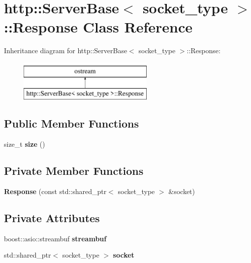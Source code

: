 \hypertarget{classhttp_1_1_server_base_1_1_response}{}\section{http\+:\+:Server\+Base$<$ socket\+\_\+type $>$\+:\+:Response Class Reference}
\label{classhttp_1_1_server_base_1_1_response}
Inheritance diagram for http\+:\+:Server\+Base$<$ socket\+\_\+type $>$\+:\+:Response\+:\begin{figure}[H]
\begin{center}
\leavevmode
\includegraphics[height=2.000000cm]{d8/d5c/classhttp_1_1_server_base_1_1_response}
\end{center}
\end{figure}
\subsection*{Public Member Functions}
\begin{DoxyCompactItemize}
\item 
\mbox{\label{classhttp_1_1_server_base_1_1_response_a1787c7986ff9f1cb724fe5aa152afb50}} 
size\+\_\+t {\bfseries size} ()
\end{DoxyCompactItemize}
\subsection*{Private Member Functions}
\begin{DoxyCompactItemize}
\item 
\mbox{\label{classhttp_1_1_server_base_1_1_response_ae703a3381a90f2bd96f7c843c74c6745}} 
{\bfseries Response} (const std\+::shared\+\_\+ptr$<$ socket\+\_\+type $>$ \&socket)
\end{DoxyCompactItemize}
\subsection*{Private Attributes}
\begin{DoxyCompactItemize}
\item 
\mbox{\label{classhttp_1_1_server_base_1_1_response_adb917414852ffe233203cc7c768fdae2}} 
boost\+::asio\+::streambuf {\bfseries streambuf}
\item 
\mbox{\label{classhttp_1_1_server_base_1_1_response_aba3a5a90f71ad29852b9ce2fcf176392}} 
std\+::shared\+\_\+ptr$<$ socket\+\_\+type $>$ {\bfseries socket}
\end{DoxyCompactItemize}
